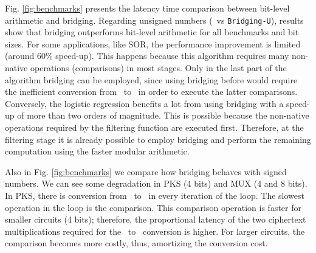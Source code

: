 
 Fig. \ref{fig:benchmarks} presents the latency time comparison between bit-level arithmetic and bridging. Regarding unsigned numbers (\secuint\ vs \texttt{Bridging-U}), results show that bridging outperforms bit-level arithmetic for all benchmarks and bit sizes. For some applications, like SOR, the performance improvement is limited (around 60\% speed-up). This happens because this algorithm requires many non-native operations (comparisons) in most stages. Only in the last part of the algorithm bridging can be employed, since using bridging before would require the inefficient conversion from \secmod\ to \secuint\ in order to execute the latter comparisons. Conversely, the logistic regression benefits a lot from using bridging with a speed-up of more than two orders of magnitude. This is possible because the non-native operations required by the filtering function are executed first. Therefore, at the filtering stage it is already possible to employ bridging and perform the remaining computation using the faster modular arithmetic.

 Also in Fig. \ref{fig:benchmarks} we compare how bridging behaves with signed numbers. We can see some degradation in PKS (4 bits) and MUX (4 and 8 bits). In PKS, there is conversion from \secint\ to \secmod\ in every iteration of the loop. The slowest operation in the loop is the comparison. This comparison operation is faster for smaller circuits (4 bits); therefore, the proportional latency of the two ciphertext multiplications required for the \secint\ to \secmod\ conversion is higher. For larger circuits, the comparison becomes more costly, thus, amortizing the conversion cost.


